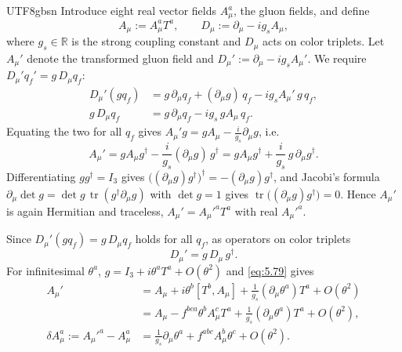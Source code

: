 \documentclass[11pt,a4paper,oneside]{report}
\begin{document}
\begin{CJK*}{UTF8}{gbsn}
Introduce eight real vector fields $A^a_\mu$, the gluon fields, and define
\begin{equation*}
A_\mu:=A^a_\mu T^a,\qquad
D_\mu:=\partial_\mu-ig_sA_\mu,
\tag{5.77}\label{eq:5.77}
\end{equation*}
where $g_s\in\mathbb R$ is the strong coupling constant and $D_\mu$ acts on color triplets. Let $A_\mu'$ denote the transformed gluon field and $D_\mu':=\partial_\mu-ig_sA_\mu'$. We require $D_\mu'q_f'=g\,D_\mu q_f$:
\begin{equation*}
\begin{aligned}
D_\mu'(gq_f)&=g\,\partial_\mu q_f+(\partial_\mu g)\,q_f-ig_sA_\mu'\,g\,q_f,\\[6pt]
g\,D_\mu q_f&=g\,\partial_\mu q_f-ig_s\,gA_\mu\,q_f.
\end{aligned}
\tag{5.78}\label{eq:5.78}
\end{equation*}
Equating the two for all $q_f$ gives $A_\mu'g=gA_\mu-\frac{i}{g_s}\partial_\mu g$, i.e.
\begin{equation*}
{\displaystyle 
A_\mu'=gA_\mu g^\dagger-\frac{i}{g_s}(\partial_\mu g)\,g^\dagger
=gA_\mu g^\dagger+\frac{i}{g_s}\,g\,\partial_\mu g^\dagger.
}
\tag{5.79}\label{eq:5.79}
\end{equation*}
Differentiating $gg^\dagger=I_3$ gives $\bigl((\partial_\mu g)g^\dagger\bigr)^\dagger=-(\partial_\mu g)g^\dagger$, and Jacobi's formula $\partial_\mu\det g=\det g\,\operatorname{tr}(g^\dagger\partial_\mu g)$ with $\det g=1$ gives $\operatorname{tr}\bigl((\partial_\mu g)g^\dagger\bigr)=0$. Hence $A_\mu'$ is again Hermitian and traceless, $A_\mu'=A_\mu'^aT^a$ with real $A_\mu'^a$.

Since $D_\mu'(gq_f)=g\,D_\mu q_f$ holds for all $q_f$, as operators on color triplets
\begin{equation*}
D_\mu'=g\,D_\mu\,g^\dagger.
\tag{5.80}\label{eq:5.80}
\end{equation*}
For infinitesimal $\theta^a$, $g=I_3+i\theta^aT^a+O(\theta^2)$ and \eqref{eq:5.79} gives
\begin{equation*}
\begin{aligned}
A_\mu'&=A_\mu+i\theta^b[T^b,A_\mu]+\frac1{g_s}(\partial_\mu\theta^a)T^a+O(\theta^2)\\
&=A_\mu-f^{bca}\theta^bA^c_\mu T^a+\frac1{g_s}(\partial_\mu\theta^a)T^a+O(\theta^2),\\[6pt]
\delta A^a_\mu:=A_\mu'^a-A_\mu^a
&=\frac1{g_s}\partial_\mu\theta^a+f^{abc}A^b_\mu\theta^c+O(\theta^2).
\end{aligned}
\tag{5.81}\label{eq:5.81}
\end{equation*}


\end{CJK*}
\end{document}
